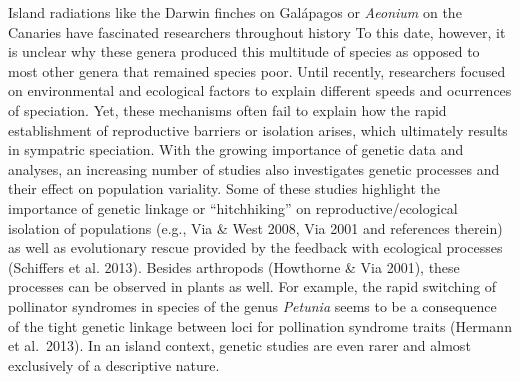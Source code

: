 \documentclass[a4paper]{scrartcl}
\begin{document}
Island radiations like the Darwin finches on Galápagos or \textit{Aeonium} on the Canaries have fascinated researchers throughout history %
To this date, however, it is unclear why these genera produced this multitude of species as opposed to most other genera that remained species poor.
Until recently, researchers focused on environmental and ecological factors to explain different speeds and ocurrences of speciation.
Yet, these mechanisms often fail to explain how the rapid establishment of reproductive barriers or isolation arises,
which ultimately results in sympatric speciation. %
With the growing importance of genetic data and analyses, an increasing number of studies also investigates genetic processes and
their effect on population variality. %
Some of these studies highlight the importance of genetic linkage or ``hitchhiking'' on reproductive/ecological isolation of populations (e.g., Via \& West 2008, Via 2001 and references therein)
as well as evolutionary rescue provided by the feedback with ecological processes (Schiffers et al. 2013).
Besides arthropods (Howthorne \& Via 2001), these processes can be observed in plants as well. %
For example, the rapid switching of pollinator syndromes in species of the genus \textit{Petunia} %
seems to be a consequence of the tight genetic linkage between loci for pollination syndrome traits (Hermann et al.\ 2013). %
In an island context, genetic studies are even rarer and almost exclusively of a descriptive nature.
\end{document}

